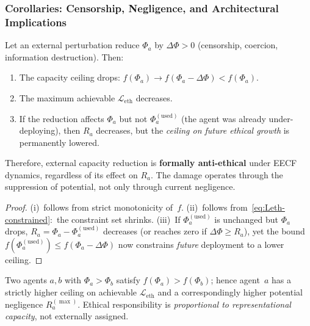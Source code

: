 \subsubsection{Corollaries: Censorship, Negligence, and Architectural Implications}
\label{sec:corollaries}

\begin{corollary}
\label{cor:censorship}
Let an external perturbation reduce $\Phi_a$ by $\Delta\Phi>0$
(censorship, coercion, information destruction).  Then:
\begin{enumerate}
    \item[(i)]  The capacity ceiling drops:
        $f(\Phi_a)\to f(\Phi_a-\Delta\Phi)<f(\Phi_a)$.
    \item[(ii)] The maximum achievable $\mathcal{L}_{\mathrm{eth}}$ decreases.
    \item[(iii)] If the reduction affects $\Phi_a$ but not
        $\Phi_a^{(\mathrm{used})}$ (the agent was already under-deploying),
        then $R_a$ decreases, but the \emph{ceiling on future ethical
        growth} is permanently lowered.
\end{enumerate}
Therefore, external capacity reduction is \textbf{formally anti-ethical}
under EECF dynamics, regardless of its effect on $R_a$.
The damage operates through the suppression of potential, not only
through current negligence.
\end{corollary}

\begin{proof}
(i)~follows from strict monotonicity of~$f$.
(ii)~follows from~\eqref{eq:Leth-constrained}:\ the constraint set shrinks.
(iii)~If $\Phi_a^{(\mathrm{used})}$ is unchanged but $\Phi_a$ drops,
$R_a=\Phi_a-\Phi_a^{(\mathrm{used})}$ decreases (or reaches zero if
$\Delta\Phi\geq R_a$), yet the bound
$f(\Phi_a^{(\mathrm{used})})\leq f(\Phi_a-\Delta\Phi)$ now constrains
\emph{future} deployment to a lower ceiling.
\end{proof}

\begin{corollary}
\label{cor:scaling}
Two agents $a,b$ with $\Phi_a>\Phi_b$ satisfy
$f(\Phi_a)>f(\Phi_b)$; hence agent~$a$ has a strictly higher ceiling
on achievable $\mathcal{L}_{\mathrm{eth}}$ and a correspondingly higher
potential negligence $R_a^{(\max)}$.
Ethical responsibility is \emph{proportional to representational capacity},
not externally assigned.
\end{corollary}

